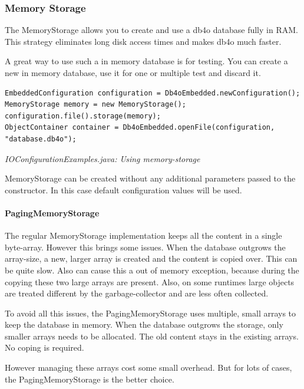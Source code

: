 \subsubsection{Memory Storage}
\label{ref:configuration-file-storage-memory-storage}

The MemoryStorage allows you to create and use a db4o database fully in RAM. This strategy eliminates long disk access times and makes db4o much faster.

A great way to use such a in memory database is for testing. You can create a new in memory database, use it for one or multiple test and discard it.

\begin{lstlisting}
EmbeddedConfiguration configuration = Db4oEmbedded.newConfiguration();
MemoryStorage memory = new MemoryStorage();
configuration.file().storage(memory);
ObjectContainer container = Db4oEmbedded.openFile(configuration, "database.db4o");
\end{lstlisting}

{\small\itshape IOConfigurationExamples.java: Using memory-storage\par}
\medskip

MemoryStorage can be created without any additional parameters passed to the constructor. In this case default configuration values will be used.

\paragraph*{PagingMemoryStorage}

The regular MemoryStorage implementation keeps all the content in a single byte-array. However this brings some issues. When the database outgrows the array-size, a new, larger array is created and the content is copied over. This can be quite slow. Also can cause this a out of memory exception, because during the copying these two large arrays are present. Also, on some runtimes large objects are treated different by the garbage-collector and are less often collected.

To avoid all this issues, the PagingMemoryStorage uses multiple, small arrays to keep the database in memory. When the database outgrows the storage, only smaller arrays needs to be allocated. The old content stays in the existing arrays. No coping is required.

However managing these arrays cost some small overhead. But for lots of cases, the PagingMemoryStorage is the better choice.

